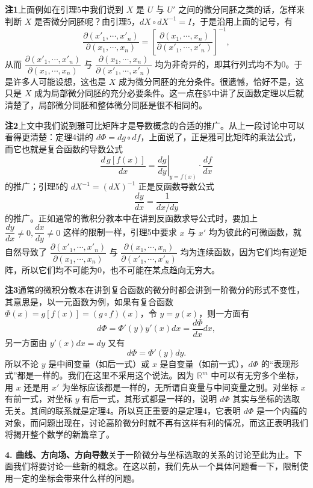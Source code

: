 \noindent\textbf{注1}\quad 上面例如在引理5中我们说到 $X$ 是 $U$ 与 $U'$ 之间的微分同胚之类的话，怎样来判断 $X$ 是否微分同胚呢？由引理5，$dX\circ dX^{-1}=I$，于是沿用上面的记号，有
\[
 \frac{\partial(x'_1,\cdots,x'_n)}{\partial(x_1,\cdots,x_n)}=
 \left[\frac{\partial(x_1,\cdots,x_n)}{\partial(x'_1,\cdots,x'_n)}\right]^{-1},
\]
从而 $\dfrac{\partial(x'_1,\cdots,x'_n)}{\partial(x_1,\cdots,x_n)}$ 与 $\dfrac{\partial(x_1,\cdots,x_n)}{\partial(x'_1,\cdots,x'_n)}$ 均为非奇异的，即其行列式均不为0。于是许多人可能设想，这也是 $X$ 成为微分同胚的充分条件。很遗憾，恰好不是，这只是 $X$ 成为局部微分同胚的充分必要条件。这一点在§5中讲了反函数定理以后就清楚了，局部微分同胚和整体微分同胚是很不相同的。

\noindent\textbf{注2}\quad 上文中我们说到雅可比矩阵才是导数概念的合适的推广。从上一段讨论中可以看得更清楚：定理4讲的 $d\Phi=dg\circ df$，上面说了，正是雅可比矩阵的乘法公式，而它也就是复合函数的导数公式
\[
 \frac{d\,g[f(x)]}{dx}=\left.\frac{dg}{dy}\right|_{y=f(x)}\cdot\frac{df}{dx}
\]
的推广；引理5的 $dX^{-1}=(dX)^{-1}$ 正是反函数导数公式
\[
 \frac{dy}{dx}=\frac1{dx/dy}
\]
的推广。正如通常的微积分教本中在讲到反函数求导公式时，要加上 $\dfrac{dy}{dx}\ne0,\dfrac{dx}{dy}\ne0$ 这样的限制一样，引理5中要求 $x$ 与 $x'$ 均为彼此的可微函数，就自然导致了 $\dfrac{\partial(x'_1,\cdots,x'_n)}{\partial(x_1,\cdots,x_n)}$ 与 $\dfrac{\partial(x_1,\cdots,x_n)}{\partial(x'_1,\cdots,x'_n)}$ 均为连续函数，因为它们均有逆矩阵，所以它们均不可能为0，也不可能在某点趋向无穷大。

\noindent\textbf{注3}\quad 通常的微积分教本在讲到复合函数的微分时都会讲到一阶微分的形式不变性，其意思是，以一元函数为例，如果有复合函数 $\Phi(x)=g[f(x)]=(g\circ f)(x)$，令 $y=g(x)$，则一方面有
\[
 d\Phi=\Phi'(y)y'(x)dx=\frac{d\Phi}{dx}dx,
\]
另一方面由 $y'(x)dx=dy$ 又有
\[
 d\Phi=\Phi'(y)dy.
\]
所以不论 $y$ 是中间变量（如后一式）或 $x$ 是自变量（如前一式），$d\Phi$ 的“表现形式”都是一样的。我们在这里不采用这个说法。因为 $\mathbb R^m$ 中可以有无穷多个坐标，用 $x$ 还是用 $x'$ 为坐标应该都是一样的，无所谓自变量与中间变量之别。对坐标 $x$ 有前一式，对坐标 $y$ 有后一式，其形式都是一样的，说明 $d\Phi$ 其实与坐标的选取无关。其间的联系就是定理4。所以真正重要的是定理4，它表明 $d\Phi$ 是一个内蕴的对象，而问题出现在，讨论高阶微分时就不再有这样有利的情况，而这正表明我们将揭开整个数学的新篇章了。

\noindent\textbf{4. 曲线、方向场、方向导数}\quad 关于一阶微分与坐标选取的关系的讨论至此为止。下面我们将要讨论一些新的概念。在这以前，我们先从一个具体问题看一下，限制使用一定的坐标会带来什么样的问题。

